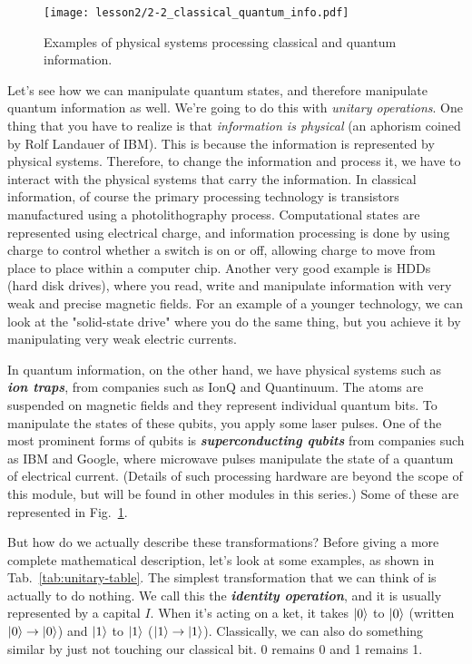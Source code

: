 \begin{figure}[H]
    \centering
    \texttt{[image: lesson2/2-2\_classical\_quantum\_info.pdf]}
        \caption[Physical information-processing systems]{Examples of physical systems processing classical and quantum information.}
    \label{fig:physical-system}
\end{figure}

Let's see how we can manipulate quantum states, and therefore manipulate quantum information as well. We're going to do this with \emph{unitary operations}. One thing that you have to realize is that \emph{information is physical} (an aphorism coined by Rolf Landauer of IBM). This is because the information is represented by physical systems. Therefore, to change the information and process it, we have to interact with the physical systems that carry the information. In classical information, of course the primary processing technology is transistors manufactured using a photolithography process.  Computational states are represented using electrical charge, and information processing is done by using charge to control whether a switch is on or off, allowing charge to move from place to place within a computer chip.  Another very good example is HDDs (hard disk drives), where you read, write and manipulate information with very weak and precise magnetic fields. For an example of a younger technology, we can look at the "solid-state drive" where you do the same thing, but you achieve it by manipulating very weak electric currents.

In quantum information, on the other hand, we have physical systems such as \textbf{\emph{ion traps}}, from companies such as IonQ and Quantinuum. The atoms are suspended on magnetic fields and they represent individual quantum bits. To manipulate the states of these qubits, you apply some laser pulses.  One of the most prominent forms of qubits is \textbf{\emph{superconducting qubits}} from companies such as IBM and Google, where microwave pulses manipulate the state of a quantum of electrical current. (Details of such processing hardware are beyond the scope of this module, but will be found in other modules in this series.) Some of these are represented in Fig.~\ref{fig:physical-system}.

But how do we actually describe these transformations? Before giving a more complete mathematical description, let's look at some examples, as shown in Tab.~\ref{tab:unitary-table}. The simplest transformation that we can think of is actually to do nothing. We call this the \textbf{\emph{identity operation}}, and it is usually represented by a capital $I$. When it's acting on a ket, it takes $\left| 0 \right\rangle$ to $\left| 0 \right\rangle$  (written $\left| 0 \right\rangle\rightarrow\left| 0 \right\rangle$) and $\left| 1 \right\rangle$ to $\left| 1 \right\rangle$ ($\left| 1 \right\rangle\rightarrow\left| 1 \right\rangle$). Classically, we can also do something similar by just not touching our classical bit. 0 remains 0 and 1 remains 1.

